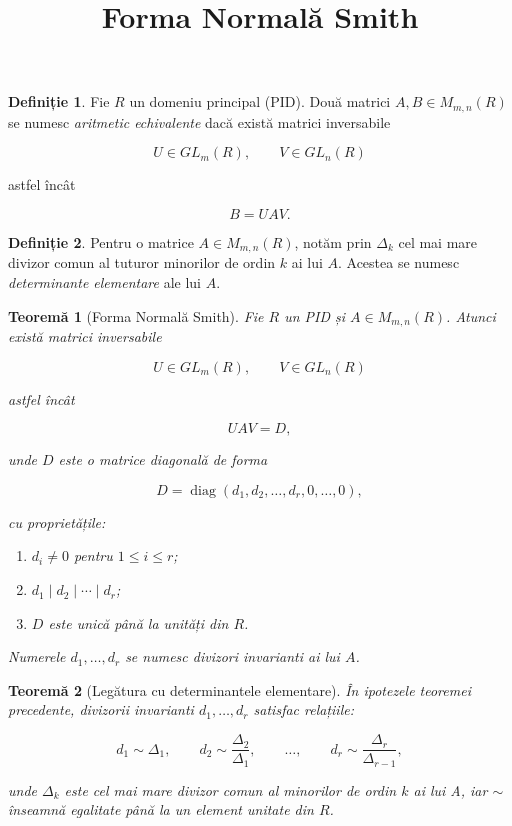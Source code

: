 \documentclass[12pt]{article}
\title{Forma Normală Smith}
\author{}
\date{}
\theoremstyle{definition}
\newtheorem{definition}{Definiție}
\theoremstyle{plain}
\newtheorem{theorem}{Teoremă}
\begin{document}
\maketitle

\begin{definition}
Fie $R$ un domeniu principal (PID). Două matrici $A, B \in M_{m,n}(R)$ se numesc
\emph{aritmetic echivalente} dacă există matrici inversabile


\[
U \in GL_m(R), \qquad V \in GL_n(R)
\]


astfel încât


\[
B = UAV.
\]


\end{definition}

\begin{definition}
Pentru o matrice $A \in M_{m,n}(R)$, notăm prin $\Delta_k$ cel mai mare divizor comun al tuturor minorilor de ordin $k$ ai lui $A$. Acestea se numesc \emph{determinante elementare} ale lui $A$.
\end{definition}

\begin{theorem}[Forma Normală Smith]
Fie $R$ un PID și $A \in M_{m,n}(R)$. Atunci există matrici inversabile


\[
U \in GL_m(R), \qquad V \in GL_n(R)
\]


astfel încât


\[
UAV = D,
\]


unde $D$ este o matrice diagonală de forma


\[
D = \operatorname{diag}(d_1, d_2, \dots, d_r, 0, \dots, 0),
\]


cu proprietățile:
\begin{enumerate}
    \item[(i)] $d_i \ne 0$ pentru $1 \le i \le r$;
    \item[(ii)] $d_1 \mid d_2 \mid \cdots \mid d_r$;
    \item[(iii)] $D$ este unică până la unități din $R$.
\end{enumerate}
Numerele $d_1, \dots, d_r$ se numesc \emph{divizori invarianti} ai lui $A$.
\end{theorem}

\begin{theorem}[Legătura cu determinantele elementare]
În ipotezele teoremei precedente, divizorii invarianti $d_1,\dots,d_r$ satisfac relațiile:


\[
d_1 \sim \Delta_1, \qquad
d_2 \sim \frac{\Delta_2}{\Delta_1}, \qquad
\dots, \qquad
d_r \sim \frac{\Delta_r}{\Delta_{r-1}},
\]


unde $\Delta_k$ este cel mai mare divizor comun al minorilor de ordin $k$ ai lui A, iar $\sim$ înseamnă egalitate până la un element unitate din $R$.
\end{theorem}
\end{document}
